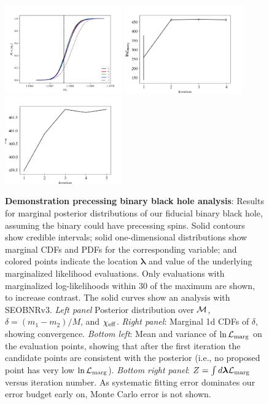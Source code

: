 \documentclass[twocolumn,prd,nofootinbib]{revtex4}
\newcommand\editremark[1]{{\color{red} #1}}
\newcommand{\mc}{{\cal M}}
\begin{document}
{\begin{figure}
\includegraphics[width=0.45\textwidth]{figures/bns_withspin_mc_cum.png}
\includegraphics[width=0.45\textwidth]{figures/bns_withspin_lnL_meanVar.png}
\includegraphics[width=0.45\textwidth]{figures/bns_withspin_lnL_converge.png}
\caption{\label{fig:BBH:Spin}\textbf{Demonstration precessing binary black hole analysis}:
Results for marginal posterior distributions
  of our fiducial binary black hole, assuming the binary could have precessing spins.  Solid contours show credible intervals; solid one-dimensional distributions
  show marginal CDFs and PDFs for the corresponding variable; and colored points indicate the location $\bm{\lambda}$ and
  value of the underlying marginalized likelihood evaluations.  Only evaluations with marginalized log-likelihoods within $30$ of the maximum are shown, to increase contrast. The solid curves show an analysis with SEOBNRv3.
 \emph{Left panel } Posterior distribution
  over  $\mc$,
  $\delta=(m_1-m_2)/M$, and $\chi_{\rm eff}$.    \emph{Right panel}: Marginal 1d CDFs of $\delta$, showing convergence.
\emph{Bottom left}: Mean and variance of  $\ln{\cal L}_{\rm marg}$ on the evaluation points,  showing that after the
first iteration the
candidate points are consistent with the posterior (i.e., no proposed point has very low $\ln {\cal L}_{\rm marg}$).
\emph{Bottom right panel}: $Z = \int d\bm{\lambda} {\cal L}_{\rm marg}$ versus iteration number.  As systematic fitting error dominates our
error budget early on, Monte Carlo error is not shown.
}
\end{figure}
}
\end{document}
